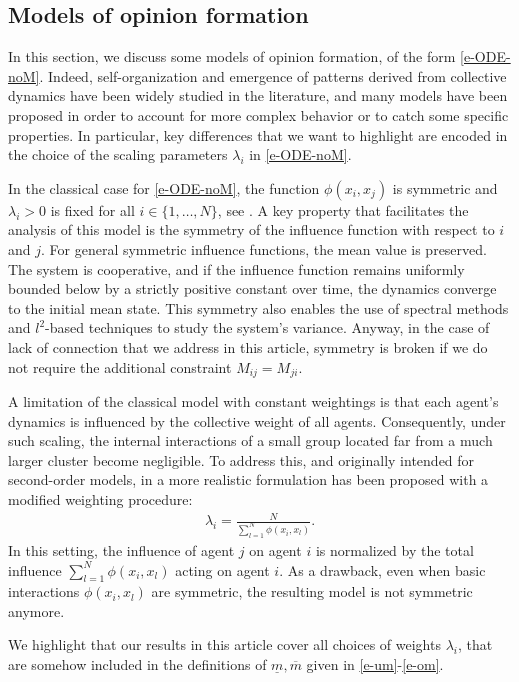 \documentclass[journal]{article}
\begin{document}
\subsection{Models of opinion formation}
\label{s-models}
In this section, we discuss some models of opinion formation, of the form \eqref{e-ODE-noM}. Indeed, self-organization and emergence of patterns derived from collective dynamics have been widely studied in the literature, and many models have been proposed in order to account for more complex behavior or to catch some specific properties. In particular, key differences that we want to highlight are encoded in the choice of the scaling parameters $\lambda_i$ in \eqref{e-ODE-noM}.

In the classical case for \eqref{e-ODE-noM}, the function $\phi(x_i,x_j)$ is symmetric and $\lambda_i > 0$ is fixed for all $i \in \{1,\ldots,N\}$, see \cite{rainer2002opinion,degroot1974reaching}. A key property that facilitates the analysis of this model is the symmetry of the influence function with respect to $i$ and $j$. For general symmetric influence functions, the mean value is preserved. The system is cooperative, and if the influence function remains uniformly bounded below by a strictly positive constant over time, the dynamics converge to the initial mean state. This symmetry also enables the use of spectral methods and $l^2$-based techniques to study the system’s variance. Anyway, in the case of lack of connection that we address in this article, symmetry is broken if we do not require the additional constraint $M_{ij}=M_{ji}$.

A limitation of the classical model with constant weightings is that each agent’s dynamics is influenced by the collective weight of all agents. Consequently, under such scaling, the internal interactions of a small group located far from a much larger cluster become negligible. To address this, and originally intended for second-order models, in \cite{motsch2011new} a more realistic formulation has been proposed with a modified weighting procedure:
\begin{align*}
    \lambda_i = \frac{N}{\sum_{l=1}^N \phi(x_i,x_l)}.
\end{align*}
In this setting, the influence of agent $j$ on agent $i$ is normalized by the total influence $\sum_{l=1}^N \phi(x_i,x_l)$ acting on agent $i$. As a drawback, even when basic interactions $\phi(x_i,x_l)$ are symmetric, the resulting model is not symmetric anymore.

We highlight that our results in this article cover all choices of weights $\lambda_i$, that are somehow included in the definitions of $\underline{m},\overline{m}$ given in \eqref{e-um}-\eqref{e-om}.
\end{document}
